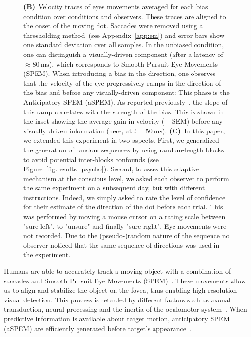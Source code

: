 \documentclass[profile,final,english, draft]{article}%
\newcommand{\ms}{\si{\milli\second}}%
\newcommand{\citep}[1]{\parencite{#1}}
\newcommand{\seeFig}[1]{Figure~\ref{fig:#1}}
\newcommand{\seeApp}[1]{Appendix~\ref{app:#1}}
\begin{document}
\begin{figure}
{\textbf{(B)}~Velocity traces of eyes movements
averaged for each bias condition
over conditions and observers.
These traces are aligned to the onset of the moving dot.
Saccades were removed using a thresholding method~(see \seeApp{em}) and
error bars show one standard deviation over all samples.
In the unbiased condition, one can distinguish
a visually-driven component (after a latency of $\approx 80~\ms$),
which corresponds to Smooth Pursuit Eye Movements (SPEM).
When introducing a bias in the direction,
one observes that the velocity of the eye progressively ramps
in the direction of the bias and before any visually-driven component:
This phase is the Anticipatory SPEM (aSPEM).
As reported previously~\citep{Montagnini2010, SantosKowler2017},
the slope of this ramp correlates with the strength of the bias.
This is shown in the inset showing the average gain in velocity ($\pm$ SEM)
before any visually driven information (here, at $t=50~\ms$).
\textbf{(C)}~In this paper, we extended this experiment in two aspects.
First, we generalized the generation of random sequences
by using random-length blocks
to avoid potential inter-blocks confounds (see \seeFig{results_psycho}).
Second, to asses this adaptive mechanism at the conscious level,
we asked each observer to perform the same experiment on a subsequent day,
but with different instructions.
Indeed, we simply asked to rate the level of confidence
for their estimate of the direction of the dot before each trial.
This was performed by moving a mouse cursor on a rating scale
between "sure left", to "unsure" and finally "sure right".
Eye movements were not recorded.
Due to the (pseudo-)random nature of the sequence no observer noticed
that the same sequence of directions was used in the experiment.
}
\label{fig:intro}
\end{figure}
Humans are able to accurately track a moving object
with a combination of saccades and
Smooth Pursuit Eye Movements (SPEM)~\citep{ref}.
These movements allow us to align and
stabilize the object on the fovea,
thus enabling high-resolution visual detection.
This process is retarded by different factors such as axonal transduction,
neural processing and the inertia of the oculomotor system~\citep{Krauzlis}.
When predictive information is available about target motion,
anticipatory SPEM (aSPEM) are
efficiently generated before target's appearance~\citep{Westheimer1954, Kowler1979a, Kowler1979b}.
\end{document}
